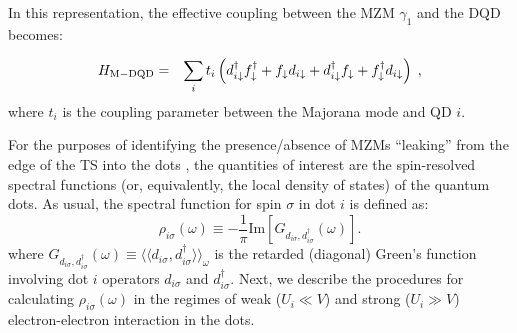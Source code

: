\documentclass[showpacs,aps,prb,reprint,superscriptaddress]{revtex4-1}
\begin{document}
In this representation, the effective coupling between the MZM $\gamma_1$ and the DQD becomes:

\begin{eqnarray}
    H_{\rm M-DQD} & = &  
\sum_{i}t_{i} \left(d_{i\downarrow}^{\dagger}f^\dagger_{\downarrow} + 
     f_{\downarrow}d_{i\downarrow} +d_{i\downarrow}^{\dagger}f_{\downarrow}+
     f_{\downarrow}^{\dagger} d_{i\downarrow}\right) \; , 
    \label{eq:H_MDQD}
\end{eqnarray}
where $t_i$ is the coupling parameter between the Majorana mode and QD $i$. %


For the purposes of identifying the presence/absence of MZMs ``leaking'' from the edge of the TS into the dots \cite{liu_detecting_2011,vernek_subtle_2014,ruiz-tijerina_interaction_2015}, the quantities of interest are the spin-resolved spectral functions (or, equivalently, the local density of states) of the quantum dots. As usual, the spectral function for spin $\sigma$ in dot $i$ is defined as:
%
%
\begin{equation}
    \rho_{i \sigma}(\omega)\equiv-\frac{1}{\pi} \textrm{Im} \left[G_{d_{i \sigma},d_{i \sigma}^\dagger}(\omega)\right].
    \label{eq:SpecFunc}
\end{equation}
%
where $G_{d_{i \sigma},d_{i \sigma}^\dagger}(\omega) \equiv \langle\langle d_{i \sigma},d_{i \sigma}^{\dagger} \rangle \rangle_\omega$ is the retarded (diagonal) Green's function involving dot $i$ operators $d_{i \sigma}$ and $d_{i \sigma}^\dagger$. Next, we describe the procedures for calculating  $\rho_{i \sigma}(\omega)$ in the regimes of weak ($U_i \ll V$) and strong ($U_i \! \gg\! V$) electron-electron interaction in the dots.


\end{document}
